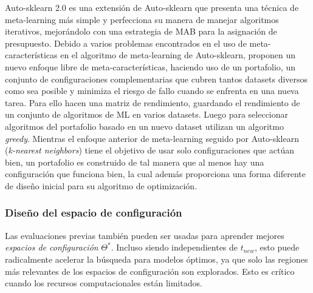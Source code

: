 Auto-sklearn 2.0 \cite{Feurer2020AutoSklearn2T} es una extensión de Auto-sklearn que presenta una técnica de meta-learning más simple y perfecciona su manera de manejar algoritmos iterativos, mejorándolo con una estrategia de MAB para la asignación de presupuesto. Debido a varios problemas encontrados en el uso de meta-características en el algoritmo de meta-learning de Auto-sklearn, proponen un nuevo enfoque libre de meta-características, haciendo uso de un portafolio, un conjunto de configuraciones complementarias que cubren tantos datasets diversos como sea posible y minimiza el riesgo de fallo cuando se enfrenta en una nueva tarea. Para ello hacen una matriz de rendimiento, guardando el rendimiento de un conjunto de algoritmos de ML en varios datasets. Luego para seleccionar algoritmos del portafolio basado en un nuevo dataset utilizan un algoritmo \textit{greedy}. Mientras el enfoque anterior de meta-learning seguido por Auto-sklearn (\textit{k-nearest neighbors}) tiene el objetivo de usar solo configuraciones que actúan bien, un portafolio es construido de tal manera que al menos hay una configuración que funciona bien, la cual además proporciona una forma diferente de diseño inicial para su algoritmo de optimización.

\subsubsection{Diseño del espacio de configuración}



Las evaluaciones previas también pueden ser usadas para aprender mejores \textit{espacios de configuración} $\Theta^*$. Incluso siendo independientes de $t_{new}$, esto puede radicalmente acelerar la búsqueda para modelos óptimos, ya que solo las regiones más relevantes de los espacios de configuración son explorados. Esto es crítico cuando los recursos computacionales están limitados. 

